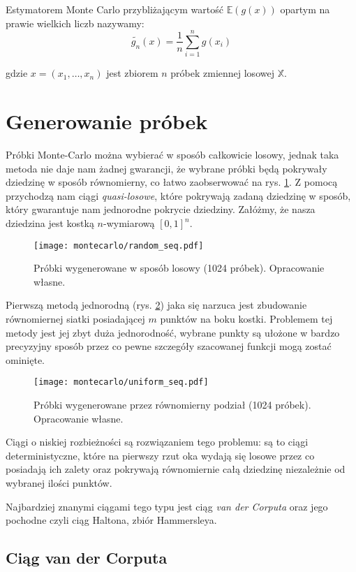 \documentclass[../main.tex]{subfiles}
\begin{document}
Estymatorem Monte Carlo przybliżającym wartość $\mathbb{E}(g(x))$ opartym na
prawie wielkich liczb nazywamy:
\[
\widetilde{g_n}(x) =
	\frac{1}{n}
	\sum_{i=1}^{n}g(x_i)
\]

\noindent gdzie $x=(x_1, \ldots, x_n)$ jest zbiorem $n$ próbek zmiennej
losowej $\mathbb{X}$.

\section{Generowanie próbek}

Próbki Monte-Carlo można wybierać w sposób całkowicie losowy, jednak taka metoda nie daje nam żadnej gwarancji, że wybrane próbki będą pokrywały dziedzinę w sposób równomierny, co łatwo zaobserwować na rys. \ref{fig:RandomSamples}. Z pomocą przychodzą nam ciągi \textit{quasi-losowe}, które pokrywają zadaną dziedzinę w sposób, który gwarantuje nam jednorodne pokrycie dziedziny. Załóżmy, że nasza dziedzina jest kostką $n$-wymiarową $[0,1]^{n}$.

\begin{figure}[h]
  \centering
  \texttt{[image: montecarlo/random\_seq.pdf]}
  \caption{Próbki wygenerowane w sposób losowy (1024 próbek). Opracowanie własne.}
  \label{fig:RandomSamples}
\end{figure}

Pierwszą metodą jednorodną (rys. \ref{fig:UniformSamples}) jaka się narzuca jest zbudowanie równomiernej siatki posiadającej $m$ punktów na boku kostki. Problemem tej metody jest jej zbyt duża jednorodność, wybrane punkty są ułożone w bardzo precyzyjny sposób przez co pewne szczegóły szacowanej funkcji mogą zostać ominięte.

\begin{figure}[h]
  \centering
  \texttt{[image: montecarlo/uniform\_seq.pdf]}
  \caption{Próbki wygenerowane przez równomierny podział (1024 próbek). Opracowanie własne.}
  \label{fig:UniformSamples}
\end{figure}

Ciągi o niskiej rozbieżności są rozwiązaniem tego problemu: są to ciągi
deterministyczne, które na pierwszy rzut oka wydają się losowe przez co posiadają ich zalety oraz pokrywają równomiernie całą dziedzinę niezależnie od wybranej ilości punktów.

Najbardziej znanymi ciągami tego typu jest ciąg \textit{van der Corputa} oraz jego pochodne czyli ciąg Haltona, zbiór Hammersleya.

\subsection{Ciąg van der Corputa}
\end{document}
